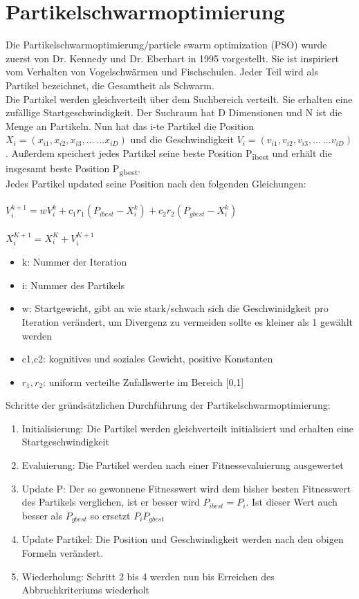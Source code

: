 \section{Partikelschwarmoptimierung}
Die Partikelschwarmoptimierung/particle swarm optimization (PSO) wurde zuerst von Dr. Kennedy und Dr. Eberhart in 1995 vorgestellt\cite{kennedy1942particle}.
Sie ist inspiriert vom Verhalten von Vogelschwärmen und Fischschulen. Jeder Teil wird als Partikel bezeichnet, die Gesamtheit als Schwarm.
\\ Die Partikel werden gleichverteilt über dem Suchbereich verteilt. Sie erhalten eine zufällige Startgeschwindigkeit. 
Der Suchraum hat D Dimensionen und N ist die Menge an Partikeln. Nun hat das i-te Partikel die Position $X_i=(x_{i1},x_{i2},x_{i3},...\ ...x_{iD})$
  und die Geschwindigkeit
  $V_{i}=(v_{i1},v_{i2},v_{i3},...\ ...v_{iD})$. Außerdem speichert jedes Partikel seine beste Position P\textsubscript{ibest} und erhält die insgesamt beste Position P\textsubscript{gbest}. 
\\
Jedes Partikel updated seine Position nach den folgenden Gleichungen:\\\\
\large $V_i^{k+1}=wV_i^k+c_1r_1(P_{ibest}-X_i^k)+c_2r_2(P_{gbest}-X_i^k)$
\\\\\normalsize
$X_i^{K+1}=X_i^K+V_i^{K+1}$
\begin{itemize}

  \item k: Nummer der Iteration
  \item i: Nummer des Partikels
  \item w: Startgewicht, gibt an wie stark/schwach sich die Geschwinidgkeit pro Iteration verändert, um Divergenz zu vermeiden sollte es  kleiner als 1 gewählt werden
  \item c1,c2: kognitives und soziales Gewicht, positive Konstanten
  \item $r_1,r_2$: uniform verteilte Zufallswerte im Bereich [0,1]

\end{itemize}
Schritte der gründsätzlichen Durchführung der Partikelschwarmoptimierung:
\begin{enumerate}
  \item Initialisierung: Die Partikel werden gleichverteilt initialisiert und erhalten eine Startgeschwindigkeit
  \item Evaluierung: Die Partikel werden nach einer Fitnessevaluierung ausgewertet 
  \item Update P: Der so gewonnene Fitnesswert wird dem bisher besten Fitnesswert des Partikels verglichen, ist er besser wird $P_{ibest}=P_i$. Ist dieser Wert auch besser als $P_{gbest}$ so ersetzt $P_i P_{gbest}$
  \item Update Partikel: Die Position und Geschwindigkeit werden nach den obigen Formeln verändert.
  \item Wiederholung: Schritt 2 bis 4 werden nun bis Erreichen des Abbruchkriteriums wiederholt
\end{enumerate}
